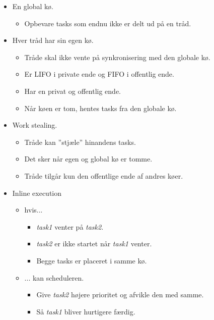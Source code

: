 \begin{itemize}
	\item En global kø.
	\begin{itemize}
		\item Opbevare tasks som endnu ikke er delt ud på en tråd.
	\end{itemize}
	\item Hver tråd har sin egen kø.
	\begin{itemize}
		\item Tråde skal ikke vente på synkronisering med den globale kø.
		\item Er LIFO i private ende og FIFO i offentlig ende.
		\item Har en privat og offentlig ende.
		\item Når køen er tom, hentes tasks fra den globale kø.
	\end{itemize}
	\item Work stealing.
	\begin{itemize}
		\item Tråde kan ''stjæle'' hinandens tasks.
		\item Det sker når egen og global kø er tomme.
		\item Tråde tilgår kun den offentlige ende af andres køer.
	\end{itemize}
	\item Inline execution
	\begin{itemize}
		\item hvis...
		\begin{itemize}
			\item \textit{task1} venter på \textit{task2}.
			\item \textit{task2} er ikke startet når \textit{task1} venter.
			\item Begge tasks er placeret i samme kø.
		\end{itemize}
		\item ... kan scheduleren.
		\begin{itemize}
			\item Give \textit{task2} højere prioritet og afvikle den med samme.
			\item Så \textit{task1} bliver hurtigere færdig.
		\end{itemize}
	\end{itemize}
\end{itemize}